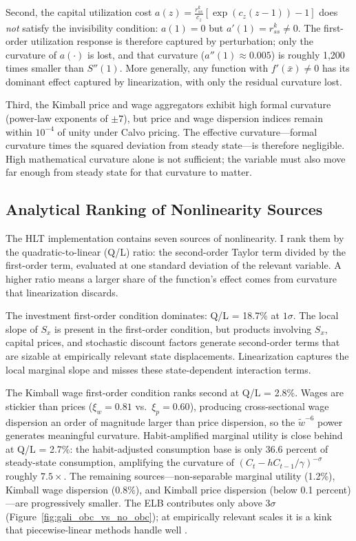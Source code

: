 \documentclass[12pt]{article}
\theoremstyle{plain}
\theoremstyle{definition}
\theoremstyle{remark}
\begin{document}
Second, the capital utilization cost $a(z) = \tfrac{r^k_{ss}}{c_z}[\exp(c_z(z-1)) - 1]$ does \emph{not} satisfy the invisibility condition: $a(1) = 0$ but $a'(1) = r^k_{ss} \neq 0$. The first-order utilization response is therefore captured by perturbation; only the curvature of $a(\cdot)$ is lost, and that curvature ($a''(1) \approx 0.005$) is roughly 1,200 times smaller than $S''(1)$. More generally, any function with $f'(\bar{x}) \neq 0$ has its dominant effect captured by linearization, with only the residual curvature lost.

Third, the Kimball price and wage aggregators exhibit high formal curvature (power-law exponents of $\pm 7$), but price and wage dispersion indices remain within $10^{-4}$ of unity under Calvo pricing. The effective curvature---formal curvature times the squared deviation from steady state---is therefore negligible. High mathematical curvature alone is not sufficient; the variable must also move far enough from steady state for that curvature to matter.

\subsection{Analytical Ranking of Nonlinearity Sources}

The HLT implementation contains seven sources of nonlinearity. I rank them by the quadratic-to-linear (Q/L) ratio: the second-order Taylor term divided by the first-order term, evaluated at one standard deviation of the relevant variable. A higher ratio means a larger share of the function's effect comes from curvature that linearization discards.

The investment first-order condition dominates: Q/L = 18.7\% at $1\sigma$. The local slope of $S_x$ is present in the first-order condition, but products involving $S_x$, capital prices, and stochastic discount factors generate second-order terms that are sizable at empirically relevant state displacements. Linearization captures the local marginal slope and misses these state-dependent interaction terms.

The Kimball wage first-order condition ranks second at Q/L = 2.8\%. Wages are stickier than prices ($\xi_w = 0.81$ vs.\ $\xi_p = 0.60$), producing cross-sectional wage dispersion an order of magnitude larger than price dispersion, so the $\tilde{w}^{-6}$ power generates meaningful curvature. Habit-amplified marginal utility is close behind at Q/L = 2.7\%: the habit-adjusted consumption base is only 36.6 percent of steady-state consumption, amplifying the curvature of $(C_t - hC_{t-1}/\gamma)^{-\sigma}$ roughly $7.5\times$. The remaining sources---non-separable marginal utility (1.2\%), Kimball wage dispersion (0.8\%), and Kimball price dispersion (below 0.1 percent)---are progressively smaller. The ELB contributes only above $3\sigma$ (Figure~\ref{fig:gali_obc_vs_no_obc}); at empirically relevant scales it is a kink that piecewise-linear methods handle well \citep{guerrieri2015occbin}.
\end{document}
